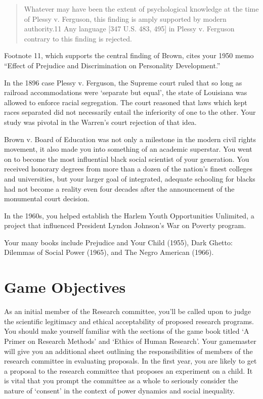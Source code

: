 \begin{refsection}
\begin{quote}
Whatever may have been the extent of psychological knowledge at the time of Plessy v. Ferguson, this finding is amply supported by modern authority.11 Any language [347 U.S. 483, 495] in Plessy v. Ferguson contrary to this finding is rejected.
\end{quote}

Footnote 11, which supports the central finding of Brown, cites your 1950 memo “Effect of Prejudice and Discrimination on Personality Development.”

In the 1896 case Plessy v. Ferguson, the Supreme court ruled that so long as railroad accommodations were `separate but equal', the state of Louisiana was allowed to enforce racial segregation. The court reasoned that laws which kept races separated did not necessarily entail the inferiority of one to the other. Your study was pivotal in the Warren's court rejection of that idea.

Brown v. Board of Education was not only a milestone in the modern civil rights movement, it also made you into something of an academic superstar. You went on to become the most influential black social scientist of your generation. You received honorary degrees from more than a dozen of the nation's finest colleges and universities, but your larger goal of integrated, adequate schooling for blacks had not become a reality even four decades after the announcement of the monumental court decision.

In the 1960s, you helped establish the Harlem Youth Opportunities Unlimited, a project that influenced President Lyndon Johnson's War on Poverty program.

Your many books include Prejudice and Your Child (1955), Dark Ghetto: Dilemmas of Social Power (1965), and The Negro American (1966). 

\section{Game Objectives}
\label{gameobjectives}

As an initial member of the Research committee, you'll be called upon to judge the scientific legitimacy and ethical acceptability of proposed research programs. You should make yourself familiar with the sections of the game book titled `A Primer on Research Methods' and `Ethics of Human Research'. Your gamemaster will give you an additional sheet outlining the responsibilities of members of the research committee in evaluating proposals. In the first year, you are likely to get a proposal to the research committee that proposes an experiment on a child. It is vital that you prompt the committee as a whole to seriously consider the nature of `consent' in the context of power dynamics and social inequality.


\end{refsection}
